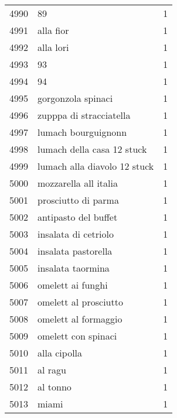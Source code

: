 \begin{tabular}{llr}
4990 &                                                 89 &      1 \\
4991 &                                          alla fior &      1 \\
4992 &                                          alla lori &      1 \\
4993 &                                                 93 &      1 \\
4994 &                                                 94 &      1 \\
4995 &                                 gorgonzola spinaci &      1 \\
4996 &                            zupppa di stracciatella &      1 \\
4997 &                                lumach bourguignonn &      1 \\
4998 &                         lumach della casa 12 stuck &      1 \\
4999 &                       lumach alla diavolo 12 stuck &      1 \\
5000 &                              mozzarella all italia &      1 \\
5001 &                                prosciutto di parma &      1 \\
5002 &                               antipasto del buffet &      1 \\
5003 &                               insalata di cetriolo &      1 \\
5004 &                                insalata pastorella &      1 \\
5005 &                                  insalata taormina &      1 \\
5006 &                                  omelett ai funghi &      1 \\
5007 &                              omelett al prosciutto &      1 \\
5008 &                               omelett al formaggio &      1 \\
5009 &                                omelett con spinaci &      1 \\
5010 &                                       alla cipolla &      1 \\
5011 &                                            al ragu &      1 \\
5012 &                                           al tonno &      1 \\
5013 &                                              miami &      1 \\

\end{tabular}
